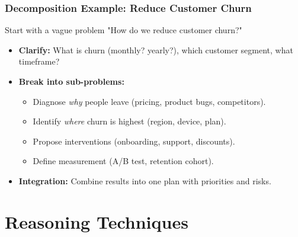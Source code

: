 \documentclass{beamer}
\begin{document}
\begin{frame}
    \frametitle{Decomposition Example: Reduce Customer Churn}
    \begin{block}{Start with a vague problem}
        "How do we reduce customer churn?"
    \end{block}
    \begin{itemize}
        \item \textbf{Clarify:} What is churn (monthly? yearly?), which customer segment, what timeframe?
        \item \textbf{Break into sub-problems:}
        \begin{itemize}
            \item Diagnose \textit{why} people leave (pricing, product bugs, competitors).
            \item Identify \textit{where} churn is highest (region, device, plan).
            \item Propose interventions (onboarding, support, discounts).
            \item Define measurement (A/B test, retention cohort).
        \end{itemize}
        \item \textbf{Integration:} Combine results into one plan with priorities and risks.
    \end{itemize}
\end{frame}

\section{Reasoning Techniques}
\end{document}
